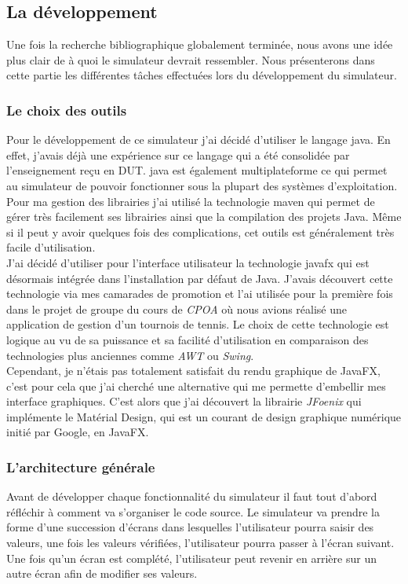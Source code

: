 \subsection{La développement}
Une fois la recherche bibliographique globalement terminée, nous avons une idée plus clair de à quoi le simulateur devrait ressembler. Nous présenterons dans cette partie les différentes tâches effectuées lors du développement du simulateur.

\subsubsection{Le choix des outils}
Pour le développement de ce simulateur j'ai décidé d'utiliser le langage \gls{java}. En effet, j'avais déjà une expérience sur ce langage qui a été consolidée par l'enseignement reçu en DUT. \gls{java} est également multiplateforme ce qui permet au simulateur de pouvoir fonctionner sous la plupart des systèmes d'exploitation.\\

Pour ma gestion des librairies j'ai utilisé la technologie \gls{maven} qui permet de gérer très facilement ses librairies ainsi que la compilation des projets Java. Même si il peut y avoir quelques fois des complications, cet outils est généralement très facile d'utilisation.\\

J'ai décidé d'utiliser pour l'interface utilisateur la technologie \gls{javafx} qui est désormais intégrée dans l'installation par défaut de Java. J'avais découvert cette technologie via mes camarades de promotion et l'ai utilisée pour la première fois dans le projet de groupe du cours de \emph{CPOA} où nous avions réalisé une application de gestion d'un tournois de tennis. Le choix de cette technologie est logique au vu de sa puissance et sa facilité d'utilisation en comparaison des technologies plus anciennes comme \emph{AWT} ou \emph{Swing}.\\
Cependant, je n'étais pas totalement satisfait du rendu graphique de JavaFX, c'est pour cela que j'ai cherché une alternative qui me permette d'embellir mes interface graphiques. C'est alors que j'ai découvert la librairie \emph{JFoenix} qui implémente le Matérial Design, qui est un courant de design graphique numérique initié par Google, en JavaFX.

\subsubsection{L'architecture générale}
Avant de développer chaque fonctionnalité du simulateur il faut tout d'abord réfléchir à comment va s'organiser le code source. Le simulateur va prendre la forme d'une succession d'écrans dans lesquelles l'utilisateur pourra saisir des valeurs, une fois les valeurs vérifiées, l'utilisateur pourra passer à l'écran suivant. Une fois qu'un écran est complété, l'utilisateur peut revenir en arrière sur un autre écran afin de modifier ses valeurs.\\

